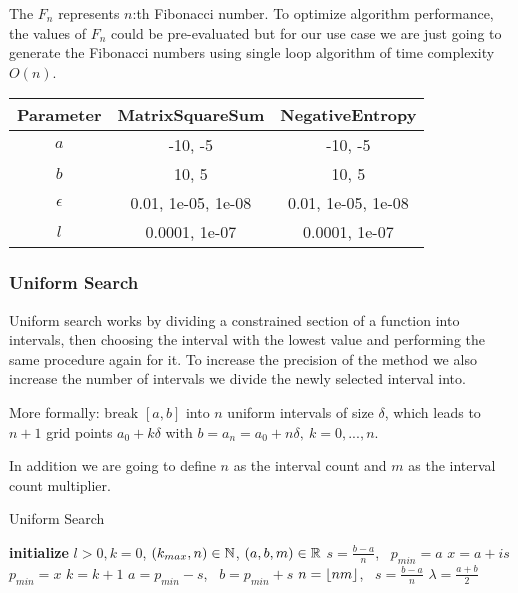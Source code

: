 \documentclass[a4paper,english,titlepage,12pt]{article}
\newcommand{\floor}[1]{\ensuremath\lfloor#1\rfloor}
\newcommand{\R}{\ensuremath\mathbb{R}}
\newcommand{\N}{\ensuremath\mathbb{N}}
\begin{document}
The $F_n$ represents $n$:th Fibonacci number. To optimize algorithm performance, the values of $F_n$ could be pre-evaluated but for our use case we are just going to generate the Fibonacci numbers using single loop algorithm of time complexity $O(n)$.

\begin{center}
\label{tab:params_FibonacciSearch}
\begin{tabular}{|c|c|c|}
\hline
\rowcolor{gray!25}
Parameter & MatrixSquareSum & NegativeEntropy \\
\hline
$a$ & -10, -5 & -10, -5 \\
$b$ & 10, 5 & 10, 5 \\
$\epsilon$ & 0.01, 1e-05, 1e-08 & 0.01, 1e-05, 1e-08 \\
$l$ & 0.0001, 1e-07 & 0.0001, 1e-07 \\
\hline
\end{tabular}
\end{center}


\subsubsection{Uniform Search}


Uniform search works by dividing a constrained section of a function into intervals, then choosing the interval with the lowest value and performing the same procedure again for it. To increase the precision of the method we also increase the number of intervals we divide the newly selected interval into.

More formally: break $[a, b]$ into $n$ uniform intervals of size $\delta$, which leads to $n + 1$ grid points $a_0 + k \delta$ with $b = a_n = a_0 + n\delta,\ k = 0, . . . , n$. \cite{course_material_nonlinear_optimisation}

In addition we are going to define $n$ as the interval count and $m$ as the interval count multiplier.

\begin{algorithm}[H]
\caption{Uniform Search}
\label{alg_uniform}
\begin{algorithmic}[1]
\STATE \textbf{initialize} $l > 0, k = 0$, $(k_{max}, n) \in \N$, $(a, b, m) \in \R$
\STATE $s = \frac{b - a}{n}$, \ $p_{min} = a$
        \STATE $x = a + i s$
            \STATE $p_{min} = x$
        \ENDIF
        \STATE $k = k + 1$
    \ENDFOR
    \STATE $a = p_{min} - s$, \ $b = p_{min} + s$
    \STATE $n = \floor{n m}$, \ $s = \frac{b - a}{n}$
\ENDWHILE
\RETURN $\lambda = \frac{a + b}{2}$
\end{algorithmic}
\end{algorithm}
\end{document}
